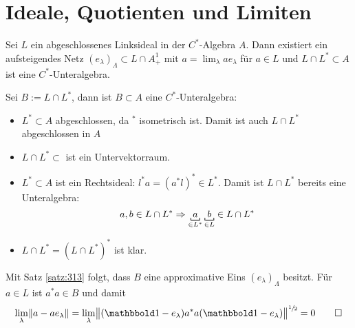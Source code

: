 \section{Ideale, Quotienten und Limiten} %
\label{sec:4}

\begin{proposition}[{name=[aus abgeschlossenem Ideal eine $C^*$-Unteralgebra bauen]},label=prop:41]
	Sei $L$ ein abgeschlossenes Linksideal in der $C^*$-Algebra $A$.
	Dann existiert ein aufsteigendes Netz $(e_\lambda)_\Lambda \subset L \cap A_+^1$ mit $a =\lim_\lambda a e_\lambda$ für $a \in L$ und $L \cap L^* \subset A$ ist eine $C^*$-Unteralgebra.
\end{proposition}
\begin{beweis}
	Sei $B := L \cap L^*$, dann ist $B \subset A$ eine $C^*$-Unteralgebra:
	\begin{itemize}[itemsep=1pt]
		\item $L^* \subset A$ abgeschlossen, da $^*$ isometrisch ist. Damit ist auch $L \cap L^*$ abgeschlossen in $A$
		\item $L \cap L^* \subset$ ist ein Untervektorraum.
		\item $L^* \subset A$ ist ein Rechtsideal: $l^* a = (a^*l)^* \in L^*$. Damit ist $L \cap L^*$ bereits eine Unteralgebra: 
		\[
			a,b \in L \cap L^* \Rightarrow \Underbracket{\minwidthbox{a}{1em}}{\in L^*} \, \Underbracket{\minwidthbox{b}{1em}}{\in L} \in L \cap L^*
		\]
		\item $L \cap L^* = (L \cap L^*)^*$ ist klar.
	\end{itemize}
	Mit Satz \autoref{satz:313} folgt, dass $B$ eine approximative Eins $(e_\lambda)_\Lambda$ besitzt. 
	Für $a \in L$ ist $a^*a \in B$ und damit 
	\[
		\lim_\lambda \norm*{a-a e_\lambda}  = \lim_\lambda \norm[\big]{(\ind-e_\lambda)a^* a(\ind-e_\lambda)}^{\sfrac{1}{2}} =0 \qedhere
	\]
\end{beweis}

